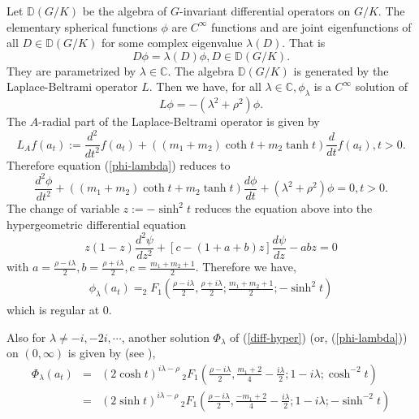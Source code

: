 \documentclass[11pt,reqno]{amsart}
\newcommand{\C}{\mathbb C}%
\theoremstyle{definition}
\theoremstyle{definition}
\numberwithin{equation}{section}
\begin{document}
Let $\mathbb D(G/K)$ be the algebra of $G$-invariant differential operators on $G/K$. The elementary spherical functions $\phi$ are $C^\infty$ functions and are joint eigenfunctions of all $D\in\mathbb D(G/K)$ for some complex eigenvalue $\lambda(D)$. That is $$D\phi=\lambda(D)\phi, D\in\mathbb D(G/K).$$They are parametrized by $\lambda\in\C$. The algebra $\mathbb D(G/K)$ is generated by the Laplace-Beltrami operator $ L$. Then we have, for all $\lambda\in\C, \phi_\lambda$ is a $C^\infty$ solution of  
\begin{equation}\label{phi-lambda}
L\phi=-(\lambda^2 + \rho^2)\phi.
\end{equation}
The $A$-radial part of the Laplace-Beltrami operator is given by 
\begin{equation} 
L_Af(a_t):=\frac{d^2}{dt^2}f (a_t)+\left((m_1+ m_2)\coth t + m_2\tanh t\right)\frac{d}{dt}f(a_t), t>0. 
\end{equation}
Therefore equation (\ref{phi-lambda}) reduces to 
\begin{equation}\label{diff-hyper}
\frac{d^2\phi}{dt^2}+\left((m_1+ m_2)\coth t + m_2\tanh t\right)\frac{d\phi}{dt} + (\lambda^2 + \rho^2)\phi=0, t>0.
\end{equation}
 The change of variable $z:=-\sinh^2 t$ reduces the equation above into the hypergeometric differential equation
\begin{equation}\label{hyper-geo}
z(1-z)\frac{d^2\psi}{dz^2} + [c-(1 + a + b)z]\frac{d\psi}{dz}-abz=0
\end{equation}
with $a=\frac{\rho-i\lambda}{2}, b=\frac{\rho+ i\lambda}{2}, c=\frac{m_1 + m_2 +1}{2}$.
Therefore we have, \begin{eqnarray}\label{phi}\phi_\lambda(a_t)=_2F_1\left(\frac{\rho-i\lambda}{2}, \frac{\rho+ i\lambda}{2}; \frac{m_1 + m_2 +1}{2}; -\sinh^2t\right)
\end{eqnarray}
which is regular at $0$.


Also for $\lambda\not=-i, -2i, \cdots$, another solution $\Phi_\lambda$ of (\ref{diff-hyper}) (or, (\ref{phi-lambda})) on $(0,\infty)$ is given by (see \cite[\S 2.9, (9) (11)]{Erdelyi-1}), 
\begin{eqnarray}\label{formula-Phi-1}
\Phi_\lambda(a_t)&=& (2\cosh t)^{i\lambda-\rho}  \,_2F_1(\frac{\rho-i\lambda}{2}, \frac{m_1 +2}{4} -\frac{i\lambda}{2}; 1-i\lambda; \cosh^{-2} t) \\
&=& (2\sinh t)^{i\lambda-\rho}  \,_2F_1(\frac{\rho-i\lambda}{2}, \frac{-m_1 +2}{4} -\frac{i\lambda}{2}; 1-i\lambda; -\sinh^{-2} t)
\label{formula-Phi-2}
\end{eqnarray}
\end{document}
